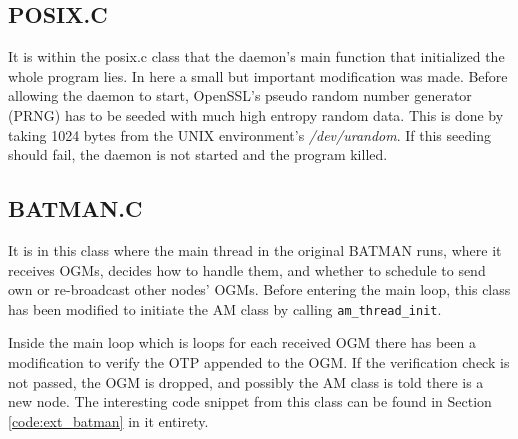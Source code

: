 \subsection{POSIX.C}\label{subsect:posix.c}
It is within the posix.c class that the daemon's main function that initialized
the whole program lies. In here a small but important modification was made.
Before allowing the daemon to start, OpenSSL's pseudo random number generator
(PRNG) has to be seeded with much high entropy random data. This is done by
taking 1024 bytes from the UNIX environment's \emph{/dev/urandom}. If this
seeding should fail, the daemon is not started and the program killed.

\subsection{BATMAN.C}\label{subsect:batman.c}
It is in this class where the main thread in the original BATMAN runs, where it
receives \acp{OGM}, decides how to handle them, and whether to schedule to send
own or re-broadcast other nodes' \acp{OGM}. Before entering the main loop, this
class has been modified to initiate the AM class by calling
\texttt{am\_thread\_init}.

Inside the main loop which is loops for each received \ac{OGM} there has been a
modification to verify the \ac{OTP} appended to the \ac{OGM}. If the
verification check is not passed, the \ac{OGM} is dropped, and possibly the AM
class is told there is a new node. The interesting code snippet from this class
can be found in Section \ref{code:ext_batman} in it entirety.

